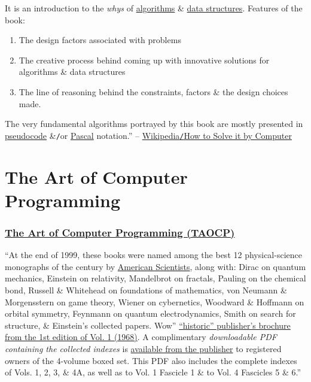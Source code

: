 \documentclass[oneside]{book}
\numberwithin{equation}{section}
\begin{document}
It is an introduction to the \textit{whys} of \href{https://en.wikipedia.org/wiki/Algorithms}{algorithms} \& \href{https://en.wikipedia.org/wiki/Data_structures}{data structures}. Features of the book:
\begin{enumerate}
	\item The design factors associated with problems
	\item The creative process behind coming up with innovative solutions for algorithms \& data structures
	\item The line of reasoning behind the constraints, factors \& the design choices made.
\end{enumerate}
The very fundamental algorithms portrayed by this book are mostly presented in \href{https://en.wikipedia.org/wiki/Pseudocode}{pseudocode} \&\texttt{/}or \href{https://en.wikipedia.org/wiki/Pascal_(programming_language)}{Pascal} notation.'' -- \href{https://en.wikipedia.org/wiki/How_to_Solve_it_by_Computer}{Wikipedia\texttt{/}How to Solve it by Computer}


\part{The Art of Computer Programming}

\section*{\href{https://www-cs-faculty.stanford.edu/~knuth/taocp.html}{The Art of Computer Programming (TAOCP)}}
``At the end of 1999, these books were named among the best 12 physical-science monographs of the century by \href{http://web.mnstate.edu/schwartz/centurylist2.html}{American Scientists}, along with: Dirac on quantum mechanics, Einstein on relativity, Mandelbrot on fractals, Pauling on the chemical bond, Russell \& Whitehead on foundations of mathematics, von Neumann \& Morgensstern on game theory, Wiener on cybernetics, Woodward \& Hoffmann on orbital symmetry, Feynmann on quantum electrodynamics, Smith on search for structure, \& Einstein's collected papers. Wow'' \href{https://www-cs-faculty.stanford.edu/~knuth/taocp.html}{``historic'' publisher's brochure from the 1st edition of Vol. 1 (1968)}. A complimentary \textit{downloadable PDF containing the collected indexes} is \href{https://www.informit.com/store/art-of-computer-programming-volumes-1-4a-boxed-set-9780321751041}{available from the publisher} to registered owners of the 4-volume boxed set. This PDF also includes the complete indexes of Vols. 1, 2, 3, \& 4A, as well as to Vol. 1 Fascicle 1 \& to Vol. 4 Fascicles 5 \& 6.''
\end{document}
